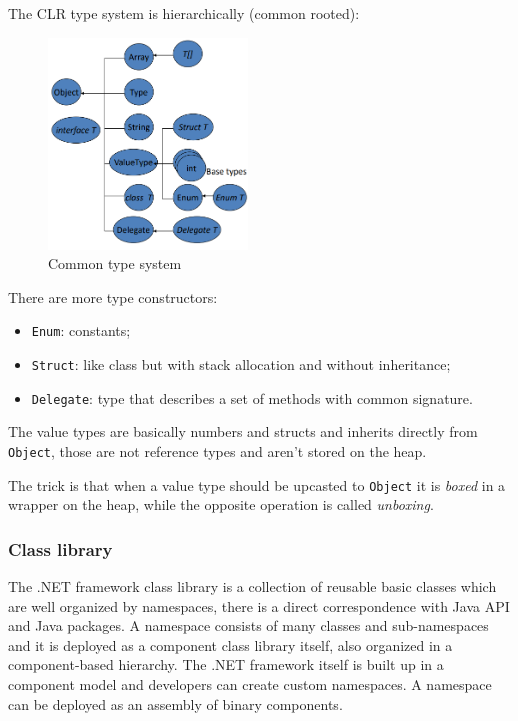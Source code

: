 The CLR type system is hierarchically (common rooted):
\begin{figure}[H]
    \centering
    \includegraphics[width=200px]{images/3_Software_Components/common_type_system.png}
    \caption{Common type system}
\end{figure}
There are more type constructors:
\begin{itemize}
    \item \verb|Enum|: constants;
    \item \verb|Struct|: like class but with stack allocation and without inheritance;
    \item \verb|Delegate|: type that describes a set of methods with common signature.
\end{itemize}
The value types are basically numbers and structs and inherits directly from \verb|Object|, those are not reference types and aren't stored on the heap.

The trick is that when a value type should be upcasted to \verb|Object| it is \emph{boxed} in a wrapper on the heap, while the opposite operation is called \emph{unboxing}.

\subsubsection{Class library}
The .NET framework class library is a collection of reusable basic classes which are well organized by namespaces, there is a direct correspondence with Java API and Java packages.
A namespace consists of many classes and sub-namespaces and it is deployed as a component class library itself, also organized in a component-based hierarchy.
The .NET framework itself is built up in a component model and developers can create custom namespaces.
A namespace can be deployed as an assembly of binary components.

